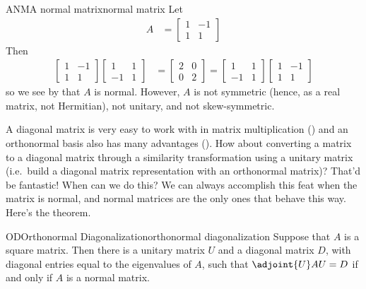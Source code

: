 %
\begin{example}{ANM}{A normal matrix}{normal matrix}
Let
%
\begin{align*}
A&=
\begin{bmatrix}
1 & -1\\1 & 1
\end{bmatrix}
\end{align*}
%
Then
%
\begin{align*}
%
\begin{bmatrix}
1 & -1\\1 & 1
\end{bmatrix}
\begin{bmatrix}
1 & 1\\-1 & 1
\end{bmatrix}
&=
\begin{bmatrix}
2 & 0\\0 & 2
\end{bmatrix}
=
\begin{bmatrix}
1 & 1\\-1 & 1
\end{bmatrix}
\begin{bmatrix}
1 & -1\\1 & 1
\end{bmatrix}
%
\end{align*}
%
so we see by  that $A$ is normal.  However, $A$ is not symmetric (hence, as a real matrix, not Hermitian), not unitary, and not skew-symmetric.
\end{example}
%
%
A diagonal matrix is very easy to work with in matrix multiplication () and an orthonormal basis also has many advantages ().  How about converting a matrix to a diagonal matrix through a similarity transformation using a unitary matrix (i.e.\ build a diagonal matrix representation with an orthonormal matrix)?  That'd be fantastic!  When can we do this?  We can always accomplish this feat when the matrix is normal, and normal matrices are the only ones that behave this way.  Here's the theorem.
%
\begin{theorem}{OD}{Orthonormal Diagonalization}{orthonormal diagonalization}
Suppose that $A$ is a square matrix.   Then there is a unitary matrix $U$ and a diagonal matrix $D$, with diagonal entries equal to the eigenvalues of $A$, such that $\adjoint{U}AU=D$ if and only if $A$ is a normal matrix.
\end{theorem}
%
